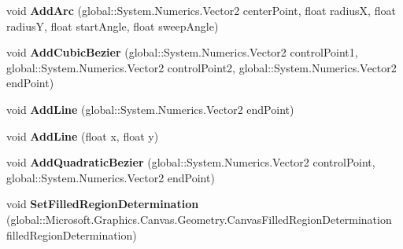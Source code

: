 \begin{DoxyCompactItemize}
\item 
\mbox{\label{interface_microsoft_1_1_graphics_1_1_canvas_1_1_geometry_1_1_i_canvas_path_builder_a176681b2cfb8be5b87fb7ff6c54d6d1c}} 
void {\bfseries Add\+Arc} (global\+::\+System.\+Numerics.\+Vector2 center\+Point, float radiusX, float radiusY, float start\+Angle, float sweep\+Angle)
\item 
\mbox{\label{interface_microsoft_1_1_graphics_1_1_canvas_1_1_geometry_1_1_i_canvas_path_builder_a0f6e31b27417edcdf586fecf8619b879}} 
void {\bfseries Add\+Cubic\+Bezier} (global\+::\+System.\+Numerics.\+Vector2 control\+Point1, global\+::\+System.\+Numerics.\+Vector2 control\+Point2, global\+::\+System.\+Numerics.\+Vector2 end\+Point)
\item 
\mbox{\label{interface_microsoft_1_1_graphics_1_1_canvas_1_1_geometry_1_1_i_canvas_path_builder_aec02c6cfb6989a2cbee2696238ec24fd}} 
void {\bfseries Add\+Line} (global\+::\+System.\+Numerics.\+Vector2 end\+Point)
\item 
\mbox{\label{interface_microsoft_1_1_graphics_1_1_canvas_1_1_geometry_1_1_i_canvas_path_builder_a2758a748e2439c467f7522f7a9b134b8}} 
void {\bfseries Add\+Line} (float x, float y)
\item 
\mbox{\label{interface_microsoft_1_1_graphics_1_1_canvas_1_1_geometry_1_1_i_canvas_path_builder_ac8de702afe0be29d6775abc66e63ac50}} 
void {\bfseries Add\+Quadratic\+Bezier} (global\+::\+System.\+Numerics.\+Vector2 control\+Point, global\+::\+System.\+Numerics.\+Vector2 end\+Point)
\item 
\mbox{\label{interface_microsoft_1_1_graphics_1_1_canvas_1_1_geometry_1_1_i_canvas_path_builder_acc584830d3f1748c8144e3800c457004}} 
void {\bfseries Set\+Filled\+Region\+Determination} (global\+::\+Microsoft.\+Graphics.\+Canvas.\+Geometry.\+Canvas\+Filled\+Region\+Determination filled\+Region\+Determination)

\end{DoxyCompactItemize}
